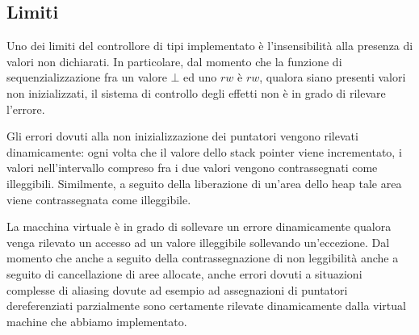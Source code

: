 \documentclass[../../main]{subfiles}
\begin{document}
\subsection{Limiti}

Uno dei limiti del controllore di tipi implementato è l'insensibilità alla presenza di valori non dichiarati. In particolare, dal momento che la funzione di sequenzializzazione fra un valore $\bot$ ed uno $rw$ è $rw$, qualora siano presenti valori non inizializzati, il sistema di controllo degli effetti non è in grado di rilevare l'errore.

Gli errori dovuti alla non inizializzazione dei puntatori vengono rilevati dinamicamente: ogni volta che il valore dello stack pointer viene incrementato, i valori nell'intervallo compreso fra i due valori vengono contrassegnati come illeggibili. Similmente, a seguito della liberazione di un'area dello heap tale area viene contrassegnata come illeggibile.

La macchina virtuale è in grado di sollevare un errore dinamicamente qualora venga rilevato un accesso ad un valore illeggibile sollevando un'eccezione. Dal momento che anche a seguito della contrassegnazione di non leggibilità anche a seguito di cancellazione di aree allocate, anche errori dovuti a situazioni complesse di aliasing dovute ad esempio ad assegnazioni di puntatori dereferenziati parzialmente sono certamente rilevate dinamicamente dalla virtual machine che abbiamo implementato.

 
\end{document}
